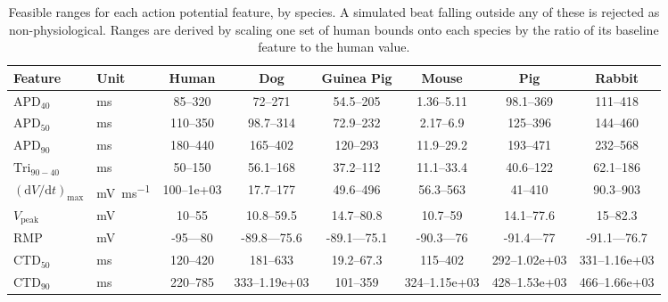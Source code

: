 \begin{table}[t]
\centering
\caption{Feasible ranges for each action potential feature, by species. A simulated beat falling outside any of these is rejected as non-physiological. Ranges are derived by scaling one set of human bounds onto each species by the ratio of its baseline feature to the human value.}
\label{tab:supp-feasible-ranges}
\footnotesize
\begin{tabular}{l l c c c c c c}
\toprule
\textbf{Feature} & \textbf{Unit} & \textbf{Human} & \textbf{Dog} & \textbf{Guinea Pig} & \textbf{Mouse} & \textbf{Pig} & \textbf{Rabbit} \\
\midrule
$\mathrm{APD}_{40}$ & \si{\milli\second} & 85--320 & 72--271 & 54.5--205 & 1.36--5.11 & 98.1--369 & 111--418 \\
$\mathrm{APD}_{50}$ & \si{\milli\second} & 110--350 & 98.7--314 & 72.9--232 & 2.17--6.9 & 125--396 & 144--460 \\
$\mathrm{APD}_{90}$ & \si{\milli\second} & 180--440 & 165--402 & 120--293 & 11.9--29.2 & 193--471 & 232--568 \\
$\mathrm{Tri}_{90-40}$ & \si{\milli\second} & 50--150 & 56.1--168 & 37.2--112 & 11.1--33.4 & 40.6--122 & 62.1--186 \\
$(\mathrm{d}V/\mathrm{d}t)_{\max}$ & \si{\milli\volt\per\milli\second} & 100--1e+03 & 17.7--177 & 49.6--496 & 56.3--563 & 41--410 & 90.3--903 \\
$V_{\mathrm{peak}}$ & \si{\milli\volt} & 10--55 & 10.8--59.5 & 14.7--80.8 & 10.7--59 & 14.1--77.6 & 15--82.3 \\
$\mathrm{RMP}$ & \si{\milli\volt} & -95---80 & -89.8---75.6 & -89.1---75.1 & -90.3---76 & -91.4---77 & -91.1---76.7 \\
$\mathrm{CTD}_{50}$ & \si{\milli\second} & 120--420 & 181--633 & 19.2--67.3 & 115--402 & 292--1.02e+03 & 331--1.16e+03 \\
$\mathrm{CTD}_{90}$ & \si{\milli\second} & 220--785 & 333--1.19e+03 & 101--359 & 324--1.15e+03 & 428--1.53e+03 & 466--1.66e+03 \\
\bottomrule
\end{tabular}
\end{table}
